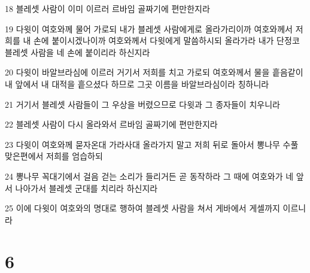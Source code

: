 \par 18 블레셋 사람이 이미 이르러 르바임 골짜기에 편만한지라
\par 19 다윗이 여호와께 물어 가로되 내가 블레셋 사람에게로 올라가리이까 여호와께서 저희를 내 손에 붙이시겠나이까 여호와께서 다윗에게 말씀하시되 올라가라 내가 단정코 블레셋 사람을 네 손에 붙이리라 하신지라
\par 20 다윗이 바알브라심에 이르러 거기서 저희를 치고 가로되 여호와께서 물을 흩음같이 내 앞에서 내 대적을 흩으셨다 하므로 그곳 이름을 바알브라심이라 칭하니라
\par 21 거기서 블레셋 사람들이 그 우상을 버렸으므로 다윗과 그 종자들이 치우니라
\par 22 블레셋 사람이 다시 올라와서 르바임 골짜기에 편만한지라
\par 23 다윗이 여호와께 묻자온대 가라사대 올라가지 말고 저희 뒤로 돌아서 뽕나무 수풀 맞은편에서 저희를 엄습하되
\par 24 뽕나무 꼭대기에서 걸음 걷는 소리가 들리거든 곧 동작하라 그 때에 여호와가 네 앞서 나아가서 블레셋 군대를 치리라 하신지라
\par 25 이에 다윗이 여호와의 명대로 행하여 블레셋 사람을 쳐서 게바에서 게셀까지 이르니라

\chapter{6}

